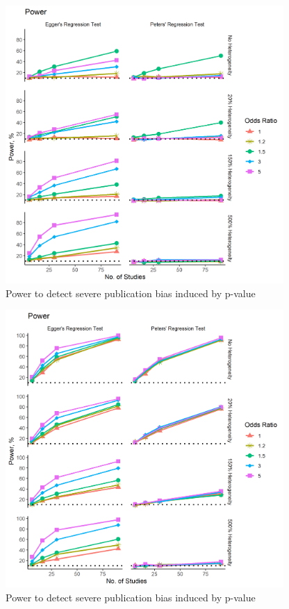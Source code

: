 \documentclass[
  english,
  doc,floatsintext,draftall]{apa6}
\begin{document}
\begin{figure}
\includegraphics[width=300pt]{../figures/power_p_moderate} \caption{Power to detect severe publication bias induced by p-value}\label{fig:unnamed-chunk-3}
\end{figure}

\begin{figure}
\includegraphics[width=300pt]{../figures/power_es_severe} \caption{Power to detect severe publication bias induced by p-value}\label{fig:unnamed-chunk-4}
\end{figure}
\end{document}
